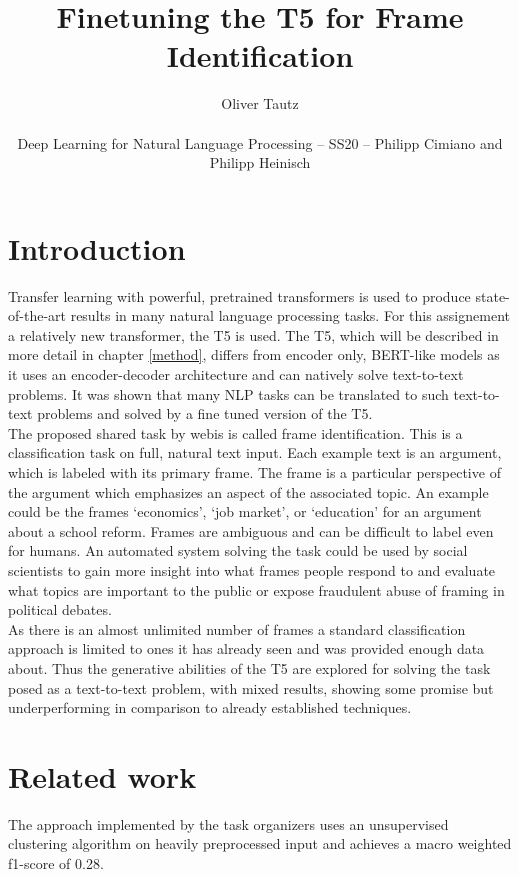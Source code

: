 \documentclass[11pt,a4paper,onecolumn,oneside,notitlepage]{article}
\author{Oliver Tautz\\
	\begin{small}
		Deep Learning for Natural Language Processing -- SS20 -- Philipp Cimiano and Philipp Heinisch
	\end{small}
}
\title{Finetuning the T5 for Frame Identification}
\begin{document}
	\maketitle
	
	\section{Introduction}
Transfer learning with powerful, pretrained transformers is used to produce state-of-the-art results in many natural language processing tasks. \citep{wolf-etal-2020-transformers} For this assignement a relatively new transformer, the T5 \citep{T5} is used. The T5, which will be described in more detail in chapter \ref{method}, differs from encoder only, BERT-like \citep{bert} models as it uses an encoder-decoder architecture and can natively solve text-to-text problems. It was shown that many NLP tasks can be translated to such text-to-text problems and solved by a fine tuned version of the T5.\citep{T5}\\


The proposed shared task by webis \citep{webis_task} is called frame identification. This is a classification task on full, natural text input. Each example text is an argument, which is labeled with its primary frame. The frame is a particular perspective of the argument which emphasizes an aspect of the associated topic. An example could be the frames ‘economics’, ‘job market’, or ‘education’ for an argument about a school reform. Frames are ambiguous and can be difficult to label even for humans. An automated system solving the task could be used by social scientists to gain more insight into what frames people respond to and evaluate what topics are important to the public or expose fraudulent abuse of framing in political debates.\\

As there is an almost unlimited number of frames a standard classification approach is limited to ones it has already seen and was provided enough data about. Thus the generative abilities of the T5 are explored for solving the task posed as a text-to-text problem, with mixed results, showing some promise but underperforming in comparison to already established techniques. 

		
\section{Related work}
The approach implemented by the task organizers \citep{webis_task_paper} uses an unsupervised clustering algorithm on heavily preprocessed input and achieves a macro weighted f1-score of \num{0.28}.\\
\end{document}
